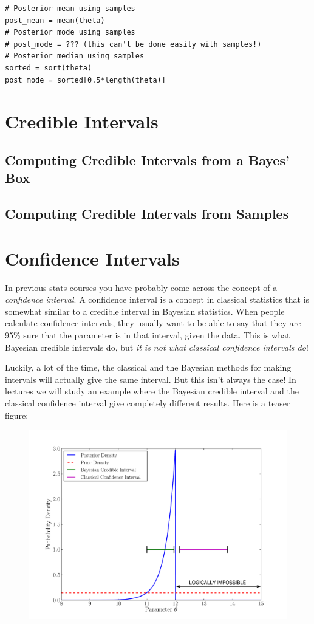 \begin{framed}
\begin{verbatim}
# Posterior mean using samples
post_mean = mean(theta)
# Posterior mode using samples
# post_mode = ??? (this can't be done easily with samples!)
# Posterior median using samples
sorted = sort(theta)
post_mode = sorted[0.5*length(theta)]
\end{verbatim}
\end{framed}


\section{Credible Intervals}

\subsection{Computing Credible Intervals from a Bayes' Box}


\subsection{Computing Credible Intervals from Samples}


\section{Confidence Intervals}
In previous stats courses you have probably come across the concept of a
{\it confidence interval}. A confidence interval is a concept in classical
statistics that is somewhat similar to a credible interval in Bayesian statistics.
When people calculate confidence intervals, they usually want to be
able to say that they are 95\% sure that the parameter is in that interval,
given the data. This is what Bayesian credible intervals do, but {\it it is not
what classical confidence intervals do}!

Luckily, a lot of the time, the classical and the Bayesian methods for making
intervals will actually give the same interval. But this isn't always the case!
In lectures we will study an example where the Bayesian credible interval and
the classical confidence interval give completely different results. Here is
a teaser figure:

\begin{figure}[ht!]
\begin{center}
\includegraphics[scale=0.5]{Figures/jaynes.pdf}
\caption{\label{fig:jaynes}}
\end{center}
\end{figure}


